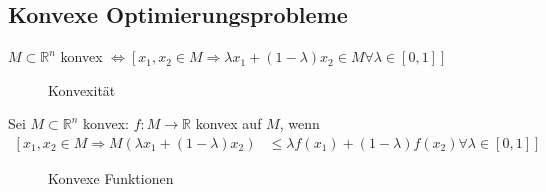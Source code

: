 \subsection{Konvexe Optimierungsprobleme}
$M\subset\mathbb{R}^n$ konvex $\Leftrightarrow \left[x_1,x_2\in M\Rightarrow \lambda x_1+(1-\lambda)x_2\in M\forall\lambda\in[0,1]\right]$
\begin{figure}[!htb]
	\centering
	\subfloat[konvex]{}\qquad
	\caption{Konvexität}
	\label{fig:kap_1_konvex}
\end{figure}

Sei $M\subset\mathbb{R}^n$ konvex: $f:M\rightarrow\mathbb{R}$ konvex auf $M$, wenn 
\begin{align*}
	\left[ x_1,x_2\in M \Rightarrow M(\lambda x_1+(1-\lambda)x_2)\right. & \left.\le \lambda f(x_1)+(1-\lambda)f(x_2)\forall\lambda\in[0,1]\right]
\end{align*}
\begin{figure}[!htb]
	\centering
	\subfloat[$f$ konvex]{}\qquad
	\caption{Konvexe Funktionen}
	\label{fig:kap_1_konvex_fkt}
\end{figure}

